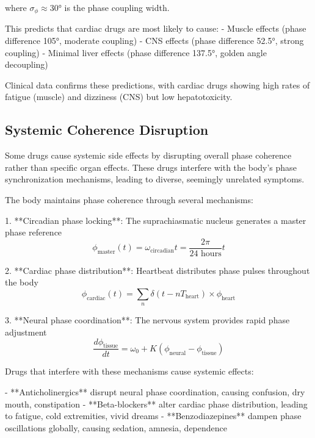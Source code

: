 \documentclass[12pt,a4paper]{report}
\begin{document}
where $\sigma_\phi \approx 30°$ is the phase coupling width.

This predicts that cardiac drugs are most likely to cause:
- Muscle effects (phase difference 105°, moderate coupling)
- CNS effects (phase difference 52.5°, strong coupling)
- Minimal liver effects (phase difference 137.5°, golden angle decoupling)

Clinical data confirms these predictions, with cardiac drugs showing high rates of fatigue (muscle) and dizziness (CNS) but low hepatotoxicity.

\subsection{Systemic Coherence Disruption}

Some drugs cause systemic side effects by disrupting overall phase coherence rather than specific organ effects. These drugs interfere with the body's phase synchronization mechanisms, leading to diverse, seemingly unrelated symptoms.

The body maintains phase coherence through several mechanisms:

1. **Circadian phase locking**: The suprachiasmatic nucleus generates a master phase reference
   \begin{equation}
   \phi_{\text{master}}(t) = \omega_{\text{circadian}} t = \frac{2\pi}{24 \text{ hours}} t
   \end{equation}

2. **Cardiac phase distribution**: Heartbeat distributes phase pulses throughout the body
   \begin{equation}
   \phi_{\text{cardiac}}(t) = \sum_n \delta(t - n T_{\text{heart}}) \times \phi_{\text{heart}}
   \end{equation}

3. **Neural phase coordination**: The nervous system provides rapid phase adjustment
   \begin{equation}
   \frac{d\phi_{\text{tissue}}}{dt} = \omega_0 + K(\phi_{\text{neural}} - \phi_{\text{tissue}})
   \end{equation}

Drugs that interfere with these mechanisms cause systemic effects:

- **Anticholinergics** disrupt neural phase coordination, causing confusion, dry mouth, constipation
- **Beta-blockers** alter cardiac phase distribution, leading to fatigue, cold extremities, vivid dreams
- **Benzodiazepines** dampen phase oscillations globally, causing sedation, amnesia, dependence
\end{document}
